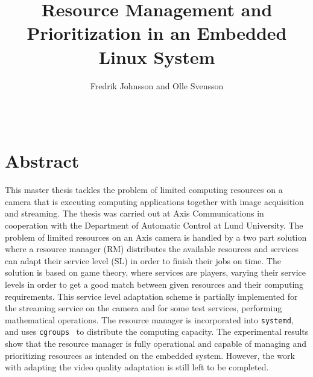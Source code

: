 \documentclass[nobiblatex]{LTHthesis}
\begin{document}


\begin{verbatim}
\end{verbatim}





\begin{titlepages}
\author{Fredrik Johnsson and Olle Svensson}
\title{Resource Management and Prioritization in an Embedded Linux System}

\end{titlepages}
\setcounter{page}{1}

\chapter*{Abstract}

This master thesis tackles the problem of limited computing resources on a
camera that is executing computing applications together with image
acquisition and streaming. The thesis was carried out at Axis Communications
in cooperation with the Department of Automatic Control at Lund University. The
problem of limited resources on an Axis camera is handled by a two part
solution where a resource manager (RM) distributes the available resources
and services can adapt their service level (SL) in order to finish their
jobs on time. The solution is based on game theory, where services are
players, varying their service levels in order to get a good match between
given resources and their computing requirements. This service level
adaptation scheme is partially implemented for the streaming service on the
camera and for some test services, performing mathematical operations. The
resource manager is incorporated into \texttt{systemd}, and uses 
\texttt{cgroups}~\cite{cgroups} to distribute the computing capacity. The
experimental results show that the resource manager is fully operational and
capable of managing and prioritizing resources as intended on the embedded
system. However, the work with adapting the video quality adaptation is still
left to be completed.
\end{document}

